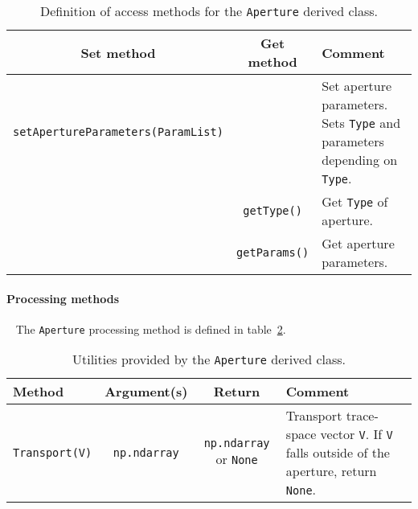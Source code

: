 \begin{table}[h]
  \caption{
    Definition of access methods for the \texttt{Aperture} derived
    class. 
  }
  \label{Tab:Aprtr:Methods}
  \begin{center}
    \begin{tabular}{|c|c|p{7cm}|}
      \hline
      \textbf{Set method} & \textbf{Get method}  & \textbf{Comment}                                  \\
      \hline
      \texttt{setApertureParameters(ParamList)} &                      & Set aperture parameters.
                                                                         Sets \texttt{Type} and parameters
                                                                         depending on \texttt{Type}. \\
                                                & \texttt{getType()} & Get \texttt{Type} of aperture.\\
                                                & \texttt{getParams()} & Get aperture parameters.    \\
      \hline
    \end{tabular}
  \end{center}
\end{table}

\paragraph{Processing methods} ~\newline
\noindent
The \texttt{Aperture} processing method is defined in
table~\ref{Tab:Aprtr:Methods}.
\begin{table}[h]
  \caption{
    Utilities provided by the \texttt{Aperture} derived
    class. 
  }
  \label{Tab:Aprtr:Methods}
  \begin{center}
    \begin{tabular}{|l|c|c|p{7cm}|}
      \hline
      \textbf{Method} & \textbf{Argument(s)} & \textbf{Return} & \textbf{Comment}                                            \\
      \hline
      \texttt{Transport(V)} & \texttt{np.ndarray} & \texttt{np.ndarray} or \texttt{None} &
                        Transport trace-space vector \texttt{V}.  If \texttt{V} falls outside of the aperture, return \texttt{None}. \\
      \hline
    \end{tabular}
  \end{center}
\end{table}

